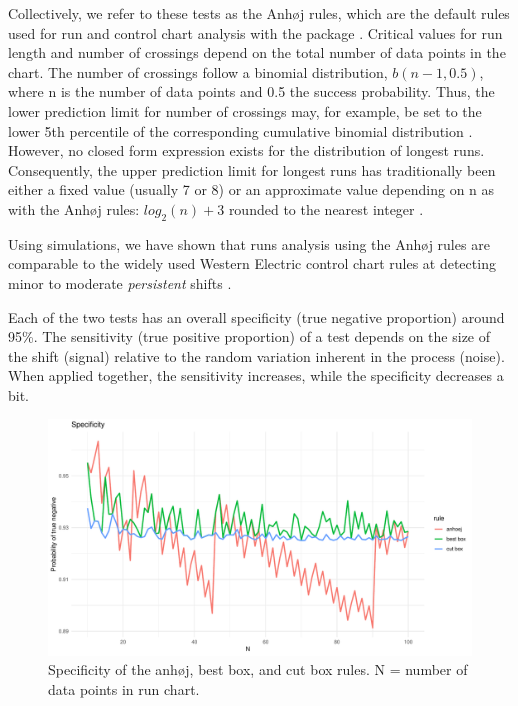 Collectively, we refer to these tests as the Anhøj rules, which are the
default rules used for run and control chart analysis with the
 package \citep{qicharts2}. Critical values for run
length and number of crossings depend on the total number of data points
in the chart. The number of crossings follow a binomial distribution,
\(b(n - 1, 0.5)\), where n is the number of data points and 0.5 the
success probability. Thus, the lower prediction limit for number of
crossings may, for example, be set to the lower 5th percentile of the
corresponding cumulative binomial distribution \citep{chen2010}.
However, no closed form expression exists for the distribution of
longest runs. Consequently, the upper prediction limit for longest runs
has traditionally been either a fixed value (usually 7 or 8)
\citep{carey2002a} or an approximate value depending on n as with the
Anhøj rules: \(log_2(n) + 3\) rounded to the nearest integer
\citep{schilling2012}.

Using simulations, we have shown that runs analysis using the Anhøj
rules are comparable to the widely used Western Electric control chart
rules at detecting minor to moderate \emph{persistent} shifts
\citep{anhoej2018}.

Each of the two tests has an overall specificity (true negative
proportion) around 95\%. The sensitivity (true positive proportion) of a
test depends on the size of the shift (signal) relative to the random
variation inherent in the process (noise). When applied together, the
sensitivity increases, while the specificity decreases a bit.

\begin{figure}[htbp]
  \centering
  \includegraphics[width=\textwidth]{fig_spec.pdf}
  \caption{Specificity of the anhøj, best box, and cut box rules. N = number of data points in run chart. }
  \label{figure:spec}
\end{figure}

